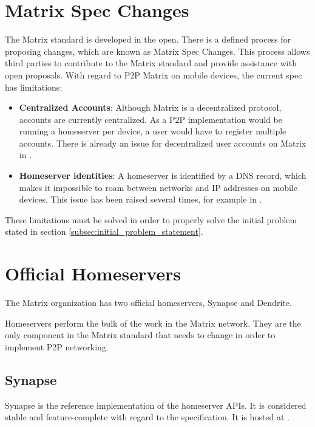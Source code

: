 \section{Matrix Spec Changes}
The Matrix standard is developed in the open.
There is a defined process for proposing changes, which are known as Matrix Spec Changes\cite{matrix_org_spec_changes}.
This process allows third parties to contribute to the Matrix standard and provide assistance with open proposals.
With regard to \ac{P2P} Matrix on mobile devices, the current spec has limitations:
\begin{itemize}
      \item{
            \textbf{Centralized Accounts}:
            Although Matrix is a decentralized protocol, accounts are currently centralized.
            As a \ac{P2P} implementation would be running a homeserver per device, a user would have to register multiple accounts.
            There is already an issue for decentralized user accounts on Matrix in .
            }
      \item{
            \textbf{Homeserver identities}:
            A homeserver is identified by a DNS record, which makes it impossible to roam between networks and IP addresses on mobile devices.
            This issue has been raised several times, for example in .
            }
\end{itemize}
These limitations must be solved in order to properly solve the initial problem stated in section \ref{subsec:initial_problem_statement}.

\section{Official Homeservers}\label{sec:official_homeservers}
The Matrix organization has two official homeservers, Synapse\cite{matrix_org_synapse} and Dendrite\cite{matrix_org_dendrite}.

Homeservers perform the bulk of the work in the Matrix network.
They are the only component in the Matrix standard that needs to change in order to implement \ac{P2P} networking\cite{fosdem_event_p2p_matrix}.

\subsection{Synapse}
Synapse is the reference implementation of the homeserver \ac{API}s.
It is considered stable and feature-complete with regard to the specification.
It is hosted at .


